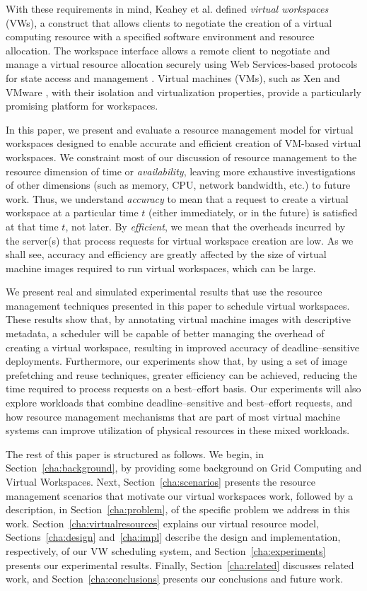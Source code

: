 With these requirements in mind, Keahey et al. \cite{VirtualWorkspaces05} defined \emph{virtual workspaces} (VWs), a construct that allows clients to negotiate the creation of a virtual computing resource with a specified software environment and resource allocation. The workspace interface allows a remote client to negotiate and manage a virtual resource allocation securely using Web Services{}-based protocols for state access and management \cite{ModelingState05}. Virtual machines (VMs), such as Xen \cite{xen} and VMware \cite{vmwareweb}, with their isolation and virtualization properties, provide a
particularly promising platform for workspaces.

In this paper, we present and evaluate a resource management model for virtual workspaces designed to enable accurate and efficient creation of VM{}-based virtual workspaces. We constraint most of our discussion of resource management to the resource dimension of time or \emph{availability}, leaving more exhaustive investigations of other dimensions (such as memory, CPU, network bandwidth, etc.) to future work. Thus, we understand \emph{accuracy} to mean that a request to create a virtual workspace at a particular time $t$ (either immediately, or in the future) is satisfied at that time $t$, not later. By \emph{efficient}, we mean that the overheads incurred by the server(s) that process requests for virtual workspace creation are low. As we shall see, accuracy and efficiency are greatly affected by the size of virtual machine images required to run virtual workspaces, which can be large. 

We present real and simulated experimental results that use the resource management techniques presented in this paper to schedule virtual workspaces. These results show that, by annotating virtual machine images with descriptive metadata, a scheduler will be capable of better managing the overhead of creating a virtual workspace, resulting in improved accuracy of deadline--sensitive deployments. Furthermore, our experiments show that, by using a set of image prefetching and reuse techniques, greater efficiency can be achieved, reducing the time required to process requests on a best--effort basis. Our experiments will also explore workloads that combine deadline--sensitive and best--effort requests, and how resource management mechanisms that are part of most virtual machine systems can improve utilization of physical resources in these mixed workloads.

The rest of this paper is structured as follows. We begin, in Section~\ref{cha:background}, by providing some background on Grid Computing and Virtual Workspaces. Next, Section~\ref{cha:scenarios} presents the resource management scenarios
that motivate our virtual workspaces work, followed by a description, in Section~\ref{cha:problem}, of the specific problem we address in this work. Section~\ref{cha:virtualresources} explains our virtual resource model, Sections~\ref{cha:design}  and~\ref{cha:impl} describe the design and implementation, respectively, of our VW scheduling system, and Section~\ref{cha:experiments} presents our experimental results. Finally, Section~\ref{cha:related} discusses related work, and Section~\ref{cha:conclusions} presents our conclusions and future work.
